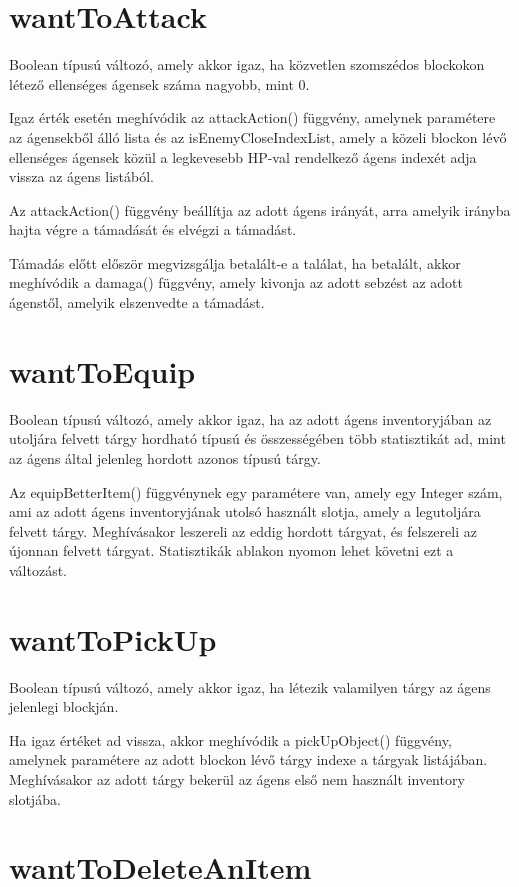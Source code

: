 \section{wantToAttack}

Boolean típusú változó, amely akkor igaz, ha közvetlen szomszédos blockokon létező
ellenséges ágensek száma nagyobb, mint 0.

Igaz érték esetén meghívódik az attackAction() függvény, amelynek paramétere az ágensekből álló lista és 
az isEnemyCloseIndexList, amely a közeli blockon lévő ellenséges ágensek közül a legkevesebb
HP-val rendelkező ágens indexét adja vissza az ágens listából.

Az attackAction() függvény beállítja az adott ágens irányát, arra amelyik irányba hajta végre a támadását és 
elvégzi a támadást.

Támadás előtt először megvizsgálja betalált-e a találat, ha betalált, akkor meghívódik a damaga() függvény, amely
kivonja az adott sebzést az adott ágenstől, amelyik elszenvedte a támadást.

\section{wantToEquip}

Boolean típusú változó, amely akkor igaz, ha az adott ágens inventoryjában az utoljára felvett tárgy hordható
típusú és összességében több statisztikát ad, mint az ágens által jelenleg hordott azonos típusú tárgy.

Az equipBetterItem() függvénynek egy paramétere van, amely egy Integer szám, ami az adott ágens inventoryjának utolsó
használt slotja, amely a legutoljára felvett tárgy. Meghívásakor leszereli az eddig hordott tárgyat, és felszereli az újonnan felvett tárgyat.
Statisztikák ablakon nyomon lehet követni ezt a változást.

\section{wantToPickUp}

Boolean típusú változó, amely akkor igaz, ha létezik valamilyen tárgy az ágens jelenlegi blockján.

Ha igaz értéket ad vissza, akkor meghívódik a pickUpObject() függvény, amelynek paramétere az adott blockon lévő tárgy
indexe a tárgyak listájában. Meghívásakor az adott tárgy bekerül az ágens első nem használt inventory slotjába.

\section{wantToDeleteAnItem}

